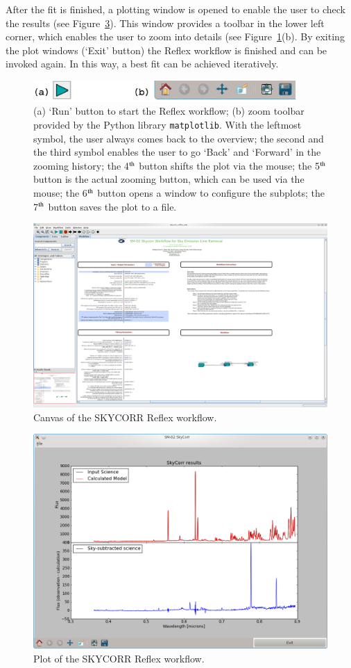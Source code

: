 After the fit is finished, a plotting window is opened to enable the user to
check the results (see Figure~\ref{fig:sc_gui}). This window provides a toolbar
in the lower left corner, which enables the user to zoom into details (see
Figure~\ref{fig:buttons}(b). By exiting the plot windows (`Exit' button) the
Reflex workflow is finished and can be invoked again. In this way, a best fit
can be achieved iteratively.
\begin{figure}
\centering
\includegraphics[width=10cm,clip=true,angle=0]{figures/refl_buttons.eps}
\caption[]{(a) `Run' button to start the Reflex workflow; (b) zoom toolbar
provided by the Python library {\tt matplotlib}. With the leftmost symbol, the
user always comes back to the overview; the second and the third symbol enables
the user to go `Back' and  `Forward' in the zooming history; the 4$^{\rm th}$
button shifts the plot via the mouse; the 5$^{\rm th}$ button is the actual
zooming button, which can be used via the mouse; the 6$^{\rm th}$ button opens a
window to configure the subplots; the 7$^{\rm th}$ button saves the plot to a
file.}
\label{fig:buttons}
\end{figure}

\begin{figure}
\centering
\includegraphics[width=21cm,clip=true,angle=-90]{figures/skycorr_reflex.png}
\caption[]{Canvas of the SKYCORR Reflex workflow.}
\label{fig:sc_reflex}
\end{figure}

\begin{figure}
\centering
\includegraphics[width=17cm,clip=true,angle=-90]{figures/skycorr_gui.png}
\caption[]{Plot of the SKYCORR Reflex workflow.}
\label{fig:sc_gui}
\end{figure}

